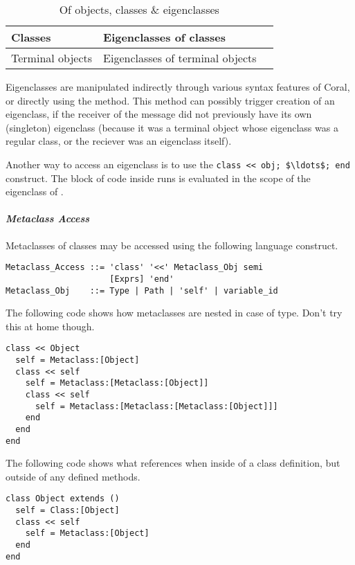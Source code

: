 \begin{table}[ht]
  \centering
  \caption{Of objects, classes \& eigenclasses}
  \renewcommand{\arraystretch}{1.7}
  \begin{tabular}{ | >{\centering}m{3.5cm} | >{\centering}m{3.5cm} | >{\centering\arraybackslash}m{6cm} | }
  	\hline
    Classes & Eigenclasses of classes & \multirow{2}{*}{Eigenclasses of eigenclasses} \\ \cline{1-2}
    Terminal objects & Eigenclasses of terminal objects & \\
    \hline
  \end{tabular}
\end{table}

Eigenclasses are manipulated indirectly through various syntax features of Coral, or directly using the  method. This method can possibly trigger creation of an eigenclass, if the receiver of the  message did not previously have its own (singleton) eigenclass (because it was a terminal object whose eigenclass was a regular class, or the reciever was an eigenclass itself). 

Another way to access an eigenclass is to use the \lstinline!class << obj; $\ldots$; end! construct. The block of code inside runs is evaluated in the scope of the eigenclass of . 

\paragraph{\em Metaclass Access}
Metaclasses of classes may be accessed using the following language construct. 

\syntax\begin{lstlisting}
Metaclass_Access ::= 'class' '<<' Metaclass_Obj semi 
                     [Exprs] 'end'
Metaclass_Obj    ::= Type | Path | 'self' | variable_id
\end{lstlisting}

\example The following code shows how metaclasses are nested in case of  type. Don't try this at home though. 
\begin{lstlisting}
class << Object
  self = Metaclass:[Object]
  class << self
    self = Metaclass:[Metaclass:[Object]]
    class << self
      self = Metaclass:[Metaclass:[Metaclass:[Object]]]
    end
  end
end
\end{lstlisting}

\example The following code shows what  references when inside of a class definition, but outside of any defined methods. 
\begin{lstlisting}
class Object extends ()
  self = Class:[Object]
  class << self
    self = Metaclass:[Object]
  end
end
\end{lstlisting}

